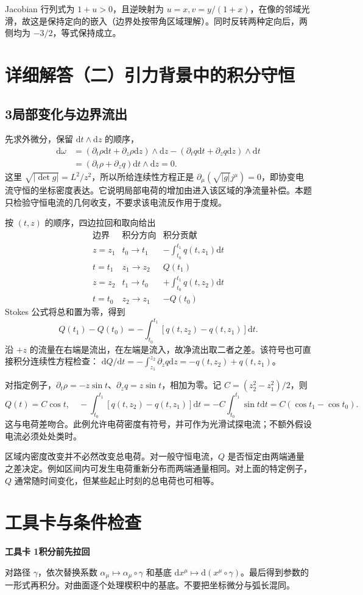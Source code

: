 \documentclass[11pt,a4paper]{article}
\newcommand{\D}{\mathrm d}
\newcommand{\head}[1]{\section*{\color{teal}#1}}
\begin{document}
Jacobian 行列式为 $1+u>0$，且逆映射为 $u=x,v=y/(1+x)$，在像的邻域光滑，故这是保持定向的嵌入（边界处按带角区域理解）。同时反转两种定向后，两侧均为 $-3/2$，等式保持成立。
\newpage
\head{详细解答（二）\quad 引力背景中的积分守恒}
\subsection*{3\quad 局部变化与边界流出}
先求外微分，保留 $\D t\wedge\D z$ 的顺序，
\[
\begin{aligned}
 \D\omega
 &=(\partial_t\rho\D t+\partial_z\rho\D z)\wedge\D z
 -(\partial_tq\D t+\partial_zq\D z)\wedge\D t\\
 &=(\partial_t\rho+\partial_zq)\D t\wedge\D z=0 .
\end{aligned}
\]
这里 $\sqrt{|\det g|}=L^2/z^2$，所以所给连续性方程正是
$\partial_\mu(\sqrt{|g|}j^\mu)=0$，即协变电流守恒的坐标密度表达。它说明局部电荷的增加由进入该区域的净流量补偿。本题只检验守恒电流的几何收支，不要求该电流反作用于度规。

按 $(t,z)$ 的顺序，四边拉回和取向给出
\[
\begin{array}{c|c|c}
 \text{边界}&\text{积分方向}&\text{积分贡献}\\ \hline
 z=z_1&t_0\to t_1&-\int_{t_0}^{t_1}q(t,z_1)\D t\\
 t=t_1&z_1\to z_2&Q(t_1)\\
 z=z_2&t_1\to t_0&+\int_{t_0}^{t_1}q(t,z_2)\D t\\
 t=t_0&z_2\to z_1&-Q(t_0)
\end{array}
\]
Stokes 公式将总和置为零，得到
\[
 \boxed{Q(t_1)-Q(t_0)
 =-\int_{t_0}^{t_1}[q(t,z_2)-q(t,z_1)]\D t.}
\]
沿 $+z$ 的流量在右端是流出，在左端是流入，故净流出取二者之差。该符号也可直接积分连续性方程检查：
$\D Q/\D t=-\int_{z_1}^{z_2}\partial_zq\D z=-q(t,z_2)+q(t,z_1)$。

对指定例子，$\partial_t\rho=-z\sin t$、$\partial_zq=z\sin t$，相加为零。记 $C=(z_2^2-z_1^2)/2$，则
\[
 Q(t)=C\cos t,\quad
 -\int_{t_0}^{t_1}[q(t,z_2)-q(t,z_1)]\D t
 =-C\int_{t_0}^{t_1}\sin t\D t
 =C(\cos t_1-\cos t_0).
\]
这与电荷差吻合。此例允许电荷密度有符号，并可作为光滑试探电流；不额外假设电流必须处处类时。

区域内密度改变并不必然改变总电荷。对一般守恒电流，$Q$ 是否恒定由两端通量之差决定。例如区间内可发生电荷重新分布而两端通量相同。对上面的特定例子，$Q$ 通常随时间变化，但某些起止时刻的总电荷也可相等。
\newpage
\head{工具卡与条件检查}
\textbf{工具卡 1\quad 积分前先拉回}\par
对路径 $\gamma$，依次替换系数 $\alpha_\mu\mapsto\alpha_\mu\circ\gamma$ 和基底 $\D x^\mu\mapsto\D(x^\mu\circ\gamma)$。最后得到参数的一形式再积分。对曲面逐个处理楔积中的基底。不要把坐标微分与弧长混同。
\end{document}
